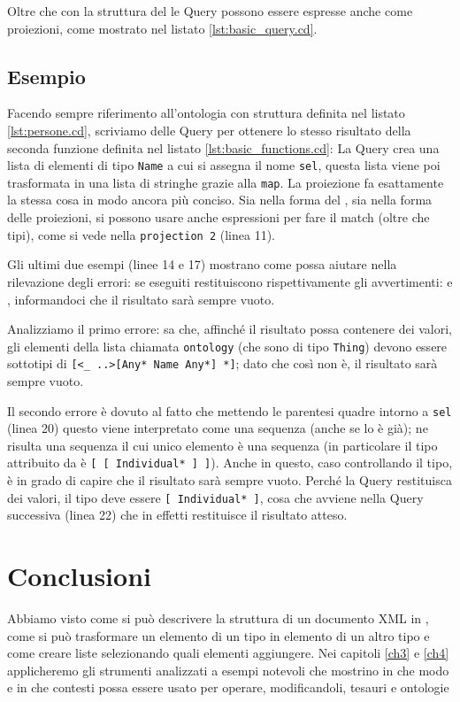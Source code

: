 Oltre che con la struttura del  le Query possono essere espresse anche come proiezioni, come mostrato nel listato \ref{lst:basic_query.cd}.

\subsection{Esempio}
Facendo sempre riferimento all'ontologia con struttura definita nel listato \ref{lst:persone.cd}, scriviamo delle Query per ottenere lo stesso risultato della seconda funzione definita nel listato \ref{lst:basic_functions.cd}:
La Query crea una lista di elementi di tipo \verb|Name| a cui si assegna il nome \verb|sel|, questa lista viene poi trasformata in una lista di stringhe grazie alla \verb|map|. La proiezione fa esattamente la stessa cosa in modo ancora più conciso. Sia nella forma del , sia nella forma delle proiezioni, si possono usare anche espressioni per fare il match (oltre che tipi), come si vede nella \verb|projection 2| (linea 11).

Gli ultimi due esempi (linee 14 e 17) mostrano come \cduce possa aiutare nella rilevazione degli errori: se eseguiti restituiscono rispettivamente gli avvertimenti:  e , informandoci che il risultato sarà sempre vuoto.

Analizziamo il primo errore: \cduce sa che, affinché il risultato possa contenere dei valori, gli elementi della lista chiamata \verb|ontology| (che sono di tipo \verb|Thing|) devono essere sottotipi di \verb|[<_ ..>[Any* Name Any*] *]|; dato che così non è, il risultato sarà sempre vuoto.

Il secondo errore è dovuto al fatto che mettendo le parentesi quadre intorno a \verb|sel| (linea 20) questo viene interpretato come una sequenza (anche se lo è già); ne risulta una sequenza il cui unico elemento è una sequenza (in particolare il tipo attribuito da \cduce è \verb|[ [ Individual* ] ]|). Anche in questo, caso controllando il tipo, \cduce è in grado di capire che il risultato sarà sempre vuoto. Perché la Query restituisca dei valori, il tipo deve essere \verb|[ Individual* ]|, cosa che avviene nella Query successiva (linea 22) che in effetti restituisce il risultato atteso.

\section{Conclusioni}
Abbiamo visto come si può descrivere la struttura di un documento XML in \cduce, come si può trasformare un elemento di un tipo in elemento di un altro tipo e come creare liste selezionando quali elementi aggiungere. Nei capitoli \ref{ch3} e \ref{ch4} applicheremo gli strumenti analizzati a esempi notevoli che mostrino in che modo e in che contesti \cduce possa essere usato per operare, modificandoli, tesauri e ontologie